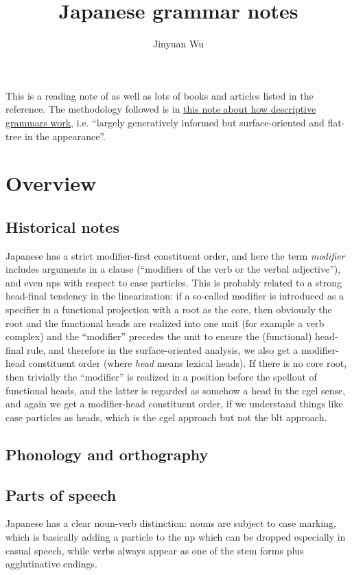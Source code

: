 \documentclass[UTF8, a4paper, oneside, scheme=plain]{ctexart}
\title{Japanese grammar notes}
\author{Jinyuan Wu}
\newcommand*{\term}[1]{\emph{#1}}
\newcommand{\method}{\href{../methodology/glossing.pdf}{this note about how descriptive grammars work}}
\begin{document}
\maketitle

This is a reading note of \citet{tsutsui1989dictionary} 
as well as lots of books and articles listed in the reference.
The methodology followed is in \method,
i.e. ``largely generatively informed but surface-oriented and flat-tree in the appearance''.

\section{Overview}

\subsection{Historical notes}

Japanese has a strict modifier-first constituent order,
and here the term \term{modifier} includes 
arguments in a clause (``modifiers of the verb or the verbal adjective''),
and even \acs{np}s with respect to case particles.
This is probably related to a strong head-final tendency in the linearization:
if a so-called modifier is introduced as a specifier 
in a functional projection with a root as the core,
then obviously the root and the functional heads are realized into one unit (for example a verb complex) 
and the ``modifier'' precedes the unit to ensure the (functional) head-final rule,
and therefore in the surface-oriented analysis,
we also get a modifier-head constituent order (where \term{head} means lexical heads).
If there is no core root,
then trivially the ``modifier'' is realized in a position before the spellout of functional heads,
and the latter is regarded as somehow a head in the \acs{cgel} sense,
and again we get a modifier-head constituent order,
if we understand things like case particles as heads,
which is the \ac{cgel} approach but not the \acs{blt} approach.

\subsection{Phonology and orthography}

\subsection{Parts of speech}

Japanese has a clear noun-verb distinction:
nouns are subject to case marking,
which is basically adding a particle to the \acs{np} 
which can be dropped especially in casual speech,
while verbs always appear as one of the stem forms plus agglutinative endings.
\end{document}
